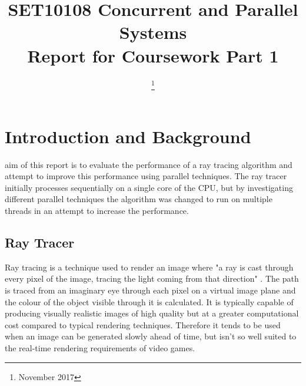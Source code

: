 \documentclass[journal,transmag]{IEEEtran}
\begin{document}
	
	\title{SET10108 Concurrent and Parallel Systems\\Report for Coursework Part 1}
	
	\author{
		
		\thanks{November 2017}}
	
	
	
	
	\maketitle
	
	\IEEEdisplaynontitleabstractindextext
	
	\IEEEpeerreviewmaketitle
	
	\section{Introduction and Background}
	 aim of this report is to evaluate the performance of a ray tracing algorithm and attempt to improve this performance using parallel techniques. The ray tracer initially processes sequentially on a single core of the CPU, but by investigating different parallel techniques the algorithm was changed to run on multiple threads in an attempt to increase the performance.
	
	\subsection{Ray Tracer}
	Ray tracing is a technique used to render an image where "a ray is cast through every pixel of the image, tracing the light coming from that direction" \cite{ray}. The path is traced from an imaginary eye through each pixel on a virtual image plane and the colour of the object visible through it is calculated. It is typically capable of producing visually realistic images of high quality but at a greater computational cost compared to typical rendering techniques. Therefore it tends to be used when an image can be generated slowly ahead of time, but isn't so well suited to the real-time rendering requirements of video games.
	
\end{document}

